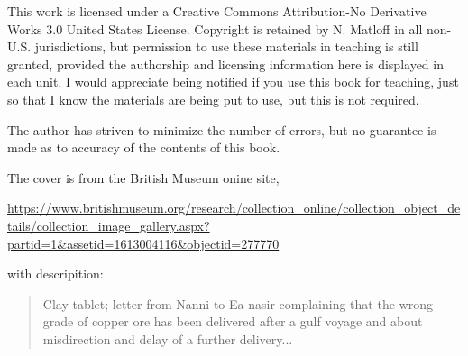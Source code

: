This work is licensed under a Creative Commons Attribution-No Derivative
Works 3.0 United States License. Copyright is retained by N. Matloff in
all non-U.S. jurisdictions, but permission to use these materials in
teaching is still granted, provided the authorship and licensing
information here is displayed in each unit. I would appreciate being
notified if you use this book for teaching, just so that I know the
materials are being put to use, but this is not required.

The author has striven to minimize the number of errors, but no
guarantee is made as to accuracy of the contents of this book.
 
The cover is from the British Museum onine site,

\url{https://www.britishmuseum.org/research/collection_online/collection_object_details/collection_image_gallery.aspx?partid=1&assetid=1613004116&objectid=277770}

with descripition:

\begin{quote}
Clay tablet; letter from Nanni to Ea-nasir complaining that the wrong
grade of copper ore has been delivered after a gulf voyage and about
misdirection and delay of a further delivery...
\end{quote}

